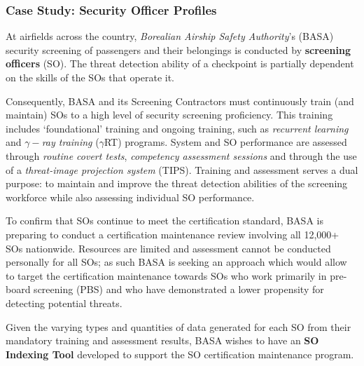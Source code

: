 \subsubsection{Case Study: Security Officer Profiles}
At airfields across the country, \textit{Borealian Airship Safety Authority}'s (BASA) security screening of passengers and their belongings is conducted
by \textbf{screening officers} (SO). The threat detection ability of a checkpoint is partially dependent on the skills of the SOs that operate it.
\par Consequently, BASA and its Screening Contractors must continuously train (and maintain) SOs to a
high level of security screening proficiency. This training includes `foundational' training and ongoing
training, such as \textit{recurrent learning} and $\gamma-$\textit{ray training} ($\gamma$RT) programs. System and SO performance are assessed through \textit{routine covert tests}, \textit{competency assessment sessions} and through the use of a \textit{threat-image projection system} (TIPS). Training and assessment serves a dual purpose: to maintain and improve the threat detection abilities of the screening workforce while also assessing individual SO performance.
\par To confirm that SOs continue to meet the certification standard, BASA is preparing to conduct
a certification maintenance review involving all 12,000+ SOs nationwide. Resources are limited and
assessment cannot be conducted personally for all SOs; as such BASA is seeking an approach which
would allow to target the certification maintenance towards SOs who work primarily in pre-board
screening (PBS) and who have demonstrated a lower propensity for detecting potential threats.
\par Given the varying types and quantities of data generated for each SO from their mandatory training
and assessment results, BASA wishes to have an \textbf{SO Indexing Tool} developed to support the SO
certification maintenance program.
